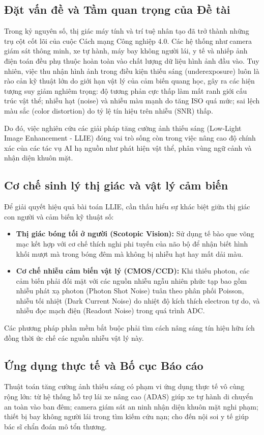 \documentclass[a4paper]{article}
\begin{document}
\subsection{Đặt vấn đề và Tầm quan trọng của Đề tài}
Trong kỷ nguyên số, thị giác máy tính và trí tuệ nhân tạo đã trở thành những trụ cột cốt lõi của cuộc Cách mạng Công nghiệp 4.0. Các hệ thống như camera giám sát thông minh, xe tự hành, máy bay không người lái, y tế và nhiếp ảnh điện toán đều phụ thuộc hoàn toàn vào chất lượng dữ liệu hình ảnh đầu vào. Tuy nhiên, việc thu nhận hình ảnh trong điều kiện thiếu sáng (underexposure) luôn là rào cản kỹ thuật lớn do giới hạn vật lý của cảm biến quang học, gây ra các hiện tượng suy giảm nghiêm trọng: độ tương phản cực thấp làm mất ranh giới cấu trúc vật thể; nhiễu hạt (noise) và nhiễu màu mạnh do tăng ISO quá mức; sai lệch màu sắc (color distortion) do tỷ lệ tín hiệu trên nhiễu (SNR) thấp. 

Do đó, việc nghiên cứu các giải pháp tăng cường ảnh thiếu sáng (Low-Light Image Enhancement - LLIE) đóng vai trò sống còn trong việc nâng cao độ chính xác của các tác vụ AI hạ nguồn như phát hiện vật thể, phân vùng ngữ cảnh và nhận diện khuôn mặt.

\subsection{Cơ chế sinh lý thị giác và vật lý cảm biến}
Để giải quyết hiệu quả bài toán LLIE, cần thấu hiểu sự khác biệt giữa thị giác con người và cảm biến kỹ thuật số:
\begin{itemize}
    \item \textbf{Thị giác bóng tối ở người (Scotopic Vision):} Sử dụng tế bào que võng mạc kết hợp với cơ chế thích nghi phi tuyến của não bộ để nhận biết hình khối mượt mà trong bóng đêm mà không bị nhiễu hạt hay mất dải màu.
    \item \textbf{Cơ chế nhiễu cảm biến vật lý (CMOS/CCD):} Khi thiếu photon, các cảm biến phải đối mặt với các nguồn nhiễu ngẫu nhiên phức tạp bao gồm nhiễu phát xạ photon (Photon Shot Noise) tuân theo phân phối Poisson, nhiễu tối nhiệt (Dark Current Noise) do nhiệt độ kích thích electron tự do, và nhiễu đọc mạch điện (Readout Noise) trong quá trình ADC.
\end{itemize}
Các phương pháp phần mềm bắt buộc phải tìm cách nâng sáng tín hiệu hữu ích đồng thời ức chế các nguồn nhiễu vật lý này.

\subsection{Ứng dụng thực tế và Bố cục Báo cáo}
Thuật toán tăng cường ảnh thiếu sáng có phạm vi ứng dụng thực tế vô cùng rộng lớn: từ hệ thống hỗ trợ lái xe nâng cao (ADAS) giúp xe tự hành di chuyển an toàn vào ban đêm; camera giám sát an ninh nhận diện khuôn mặt nghi phạm; thiết bị bay không người lái trong tìm kiếm cứu nạn; cho đến nội soi y tế giúp bác sĩ chẩn đoán mô tổn thương.
\end{document}
